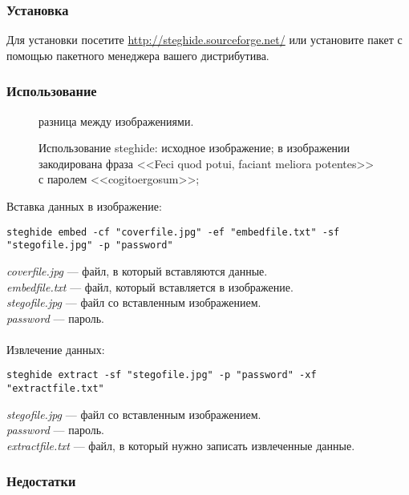 \subsubsection{Установка}
Для установки посетите \url{http://steghide.sourceforge.net/} или установите пакет с помощью пакетного менеджера вашего дистрибутива.
\subsubsection{Использование}
\begin{figure}[ht!]
\vspace{-4ex}
\centering
{}
\hspace{4ex}
\hspace{4ex}
\caption{Использование steghide: 
 исходное изображение; 
 в изображении закодирована фраза <<Feci quod potui, faciant meliora potentes>> с паролем <<cogitoergosum>>; 
} разница между изображениями.
\end{figure}
Вставка данных в изображение:
\begin{lstlisting}
steghide embed -cf "coverfile.jpg" -ef "embedfile.txt" -sf "stegofile.jpg" -p "password"
\end{lstlisting}
\textit{coverfile.jpg} --- файл, в который вставляются данные.\\
\textit{embedfile.txt} --- файл, который вставляется в изображение.\\
\textit{stegofile.jpg} --- файл со вставленным изображением.\\
\textit{password} --- пароль.\\\\
Извлечение данных:
\begin{lstlisting}
steghide extract -sf "stegofile.jpg" -p "password" -xf "extractfile.txt"
\end{lstlisting}
\textit{stegofile.jpg} --- файл со вставленным изображением.\\
\textit{password} --- пароль.\\
\textit{extractfile.txt} --- файл, в который нужно записать извлеченные данные.
\subsubsection{Недостатки}
